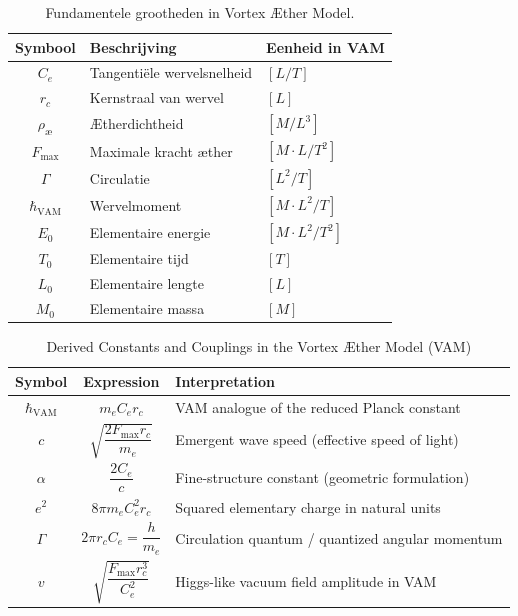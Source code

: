 \begin{table}[h!]
    \centering
    \begin{tabular}{|c|l|l|}
        \hline
        \textbf{Symbool} & \textbf{Beschrijving} & \textbf{Eenheid in VAM} \\
        \hline
        $C_e$ & Tangentiële wervelsnelheid & $[L/T]$ \\
        $r_c$ & Kernstraal van wervel & $[L]$ \\
        $\rho_\text{\ae}$ & Ætherdichtheid & $[M/L^3]$ \\
        $F_\text{max}$ & Maximale kracht æther & $[M \cdot L/T^2]$ \\
        $\Gamma$ & Circulatie & $[L^2/T]$ \\
        $\hbar_\text{VAM}$ & Wervelmoment & $[M \cdot L^2 / T]$ \\
        $E_0$ & Elementaire energie & $[M \cdot L^2 / T^2]$ \\
        $T_0$ & Elementaire tijd & $[T]$ \\
        $L_0$ & Elementaire lengte & $[L]$ \\
        $M_0$ & Elementaire massa & $[M]$ \\
        \hline
    \end{tabular}
    \caption{Fundamentele grootheden in Vortex Æther Model.}
\end{table}

\begin{table}[H]
    \centering
    \caption{Derived Constants and Couplings in the Vortex Æther Model (VAM)}
    \begin{tabular}{|c|c|l|}
        \hline
        \textbf{Symbol} & \textbf{Expression} & \textbf{Interpretation} \\
        \hline
        $\hbar_\text{VAM}$ & $m_e C_e r_c$ & VAM analogue of the reduced Planck constant \\
        \hline
        $c$ & $\sqrt{\dfrac{2 F_\text{max} r_c}{m_e}}$ & Emergent wave speed (effective speed of light) \\
        \hline
        $\alpha$ & $\dfrac{2 C_e}{c}$ & Fine-structure constant (geometric formulation) \\
        \hline
        $e^2$ & $8\pi m_e C_e^2 r_c$ & Squared elementary charge in natural units \\
        \hline
        $\Gamma$ & $2\pi r_c C_e = \dfrac{h}{m_e}$ & Circulation quantum / quantized angular momentum \\
        \hline
        $v$ & $\sqrt{\dfrac{F_\text{max} r_c^3}{C_e^2}}$ & Higgs-like vacuum field amplitude in VAM \\
        \hline
    \end{tabular}
    \label{tab:VAM_constants}
\end{table}




